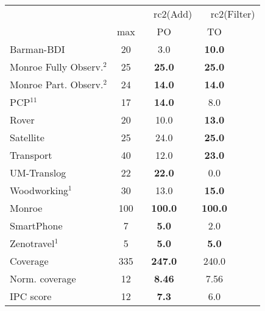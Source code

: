 \begin{tabular}{lccccl} 
\toprule 
  && \multicolumn{2}{c}{rc2(Add)} & \multicolumn{2}{c}{rc2(Filter)} \\ 
\cmidrule(lr){3-4} \cmidrule(lr){5-6}  
 & max &PO &\multicolumn{2}{c}{ TO  } \\ 
\midrule 
Barman-BDI & 20 & 3.0 &\multicolumn{2}{c}{ \textbf{10.0}  } \\ 
Monroe Fully Observ.$^{2}$ & 25 & \textbf{25.0} &\multicolumn{2}{c}{ \textbf{25.0}  } \\ 
Monroe Part. Observ.$^{2}$ & 24 & \textbf{14.0} &\multicolumn{2}{c}{ \textbf{14.0}  } \\ 
PCP$^{11}$ & 17 & \textbf{14.0} &\multicolumn{2}{c}{ 8.0  } \\ 
Rover & 20 & 10.0 &\multicolumn{2}{c}{ \textbf{13.0}  } \\ 
Satellite & 25 & 24.0 &\multicolumn{2}{c}{ \textbf{25.0}  } \\ 
Transport & 40 & 12.0 &\multicolumn{2}{c}{ \textbf{23.0}  } \\ 
UM-Translog & 22 & \textbf{22.0} &\multicolumn{2}{c}{ 0.0  } \\ 
Woodworking$^{1}$ & 30 & 13.0 &\multicolumn{2}{c}{ \textbf{15.0}  } \\ 
\midrule 
 Monroe & 100 & \textbf{100.0} &\multicolumn{2}{c}{ \textbf{100.0}  } \\ 
SmartPhone & 7 & \textbf{5.0} &\multicolumn{2}{c}{ 2.0  } \\ 
Zenotravel$^{1}$ & 5 & \textbf{5.0} &\multicolumn{2}{c}{ \textbf{5.0}  } \\ 
\midrule 
 Coverage & 335 & \textbf{247.0} &\multicolumn{2}{c}{ 240.0  } \\ 
Norm. coverage & 12 & \textbf{8.46} &\multicolumn{2}{c}{ 7.56  } \\ 
IPC score & 12 & \textbf{7.3} &\multicolumn{2}{c}{ 6.0  } \\ 
\bottomrule 
 \end{tabular} 
